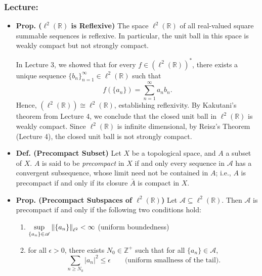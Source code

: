 \documentclass{article}
\begin{document}
\subsubsection{Lecture:}
\begin{itemize}
	\item \textbf{Prop. ($\ell^{2}(\mathbb{R})$ is Reflexive)} The space $\ell^{2}(\mathbb{R})$ of all real-valued square summable sequences is reflexive. In particular, the unit ball in this space is weakly compact but not strongly compact. 
	
	\begin{solutions}
		In Lecture 3, we showed that for every $f \in (\ell^{2}(\mathbb{R}))^{\ast}$, there exists a unique sequence $\{b_{n}\}_{n = 1}^{\infty} \in \ell^{2}(\mathbb{R})$ such that 
		\begin{equation}
			f(\{a_{n}\}) = \sum_{n = 1}^{\infty}a_{n}b_{n}. 
		\end{equation} 
		Hence, $(\ell^{2}(\mathbb{R})) \cong \ell^{2}(\mathbb{R})$, establishing reflexivity. By Kakutani's theorem from Lecture 4, we conclude that the closed unit ball in $\ell^{2}(\mathbb{R})$ is weakly compact. Since $\ell^{2}(\mathbb{R})$ is infinite dimensional, by Reisz's Theorem (Lecture 4), the closed unit ball is not strongly compact. 
	\end{solutions}
	
	\item \textbf{Def. (Precompact Subset)} Let $X$ be a topological space, and $A$ a subset of $X$. $A$ is said to be \textit{precompact} in $X$ if and only every sequence in $\mathscr{A}$ has a convergent subsequence, whose limit need not be contained in $A$; i.e., $A$ is precompact if and only if its closure $\bar{A}$ is compact in $X$. 
	
	\item \textbf{Prop. (Precompact Subspaces of $\ell^{2}(\mathbb{R})$)} Let $\mathscr{A} \subseteq \ell^{2}(\mathbb{R})$. Then $\mathscr{A}$ is precompact if and only if the following two conditions hold: 
	\begin{enumerate}[itemsep =-2pt,label = (\arabic{*})]
		\item $\sup\limits_{\{a_{n}\} \in \mathscr{A}}\left\Vert \{a_{n}\} \right\Vert_{\ell^{2}} < \infty$ (uniform boundedness) 
		\item for all $\epsilon > 0$, there exists $N_{0} \in \mathbb{Z}^{+}$ such that for all $\{a_{n}\} \in \mathscr{A}$, 
		\begin{equation}
			\sum_{n\geq N_{0}}|a_{n}|^{2} \leq \epsilon \qquad \text{(uniform smallness of the tail)}.
		\end{equation}
	\end{enumerate}
	

\end{itemize}
\end{document}
